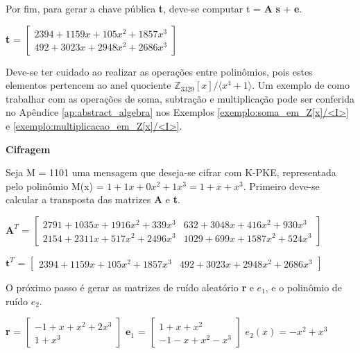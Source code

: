         Por fim, para gerar a chave pública \textbf{t}, deve-se computar t = \textbf{A} \textbf{s} + \textbf{e}.

        \begin{center}
             \textbf{t} = $\begin{bmatrix}
                2394 + 1159 x + 105 x^2 + 1857 x^3 \\
                492 + 3023 x + 2948 x^2 + 2686 x^3 
            \end{bmatrix}$   
        \end{center}

        Deve-se ter cuidado ao realizar as operações entre polinômios, pois estes elementos pertencem ao anel quociente $\mathbb{Z}_{3329}[x] / \langle x^4+1 \rangle$. Um exemplo de como trabalhar com as operações de soma, subtração e multiplicação pode ser conferida no Apêndice \ref{ap:abstract_algebra} nos Exemplos \ref{exemplo:soma_em_Z[x]/<I>} e \ref{exemplo:multiplicacao_em_Z[x]/<I>}.

    \noindent
    \textbf{Cifragem}

    Seja M  = 1101 uma mensagem que deseja-se cifrar com K-PKE, representada pelo polinômio M(x) = $1 + 1x + 0 x^2 + 1x^3 = 1+x+x^3$. Primeiro deve-se calcular a transposta das matrizes \textbf{A} e \textbf{t}.

    \begin{center}
       $\textbf{A}^T$ = $\begin{bmatrix}
           2791 + 1035 x + 1916 x^2 + 339 x^3  & 632 + 3048 x + 416 x^2 + 930 x^3 \\
           2154 + 2311 x + 517 x^2 + 2496 x^3  & 1029 + 699 x + 1587 x^2 + 524 x^3
        \end{bmatrix}$

       $\textbf{t}^T$ = $\begin{bmatrix}
           2394 + 1159 x + 105 x^2 + 1857 x^3 & 492 + 3023 x + 2948 x^2 + 2686 x^3 
        \end{bmatrix}$
    \end{center}

    O próximo passo é gerar as matrizes de ruído aleatório \textbf{r} e \textbf{$e_1$}, e o polinômio de ruído \textbf{$e_2$}.

    \begin{center}
        \textbf{r} = $\begin{bmatrix}
           -1 + x + x^2 + 2 x^3 \\
            1 + x^3
        \end{bmatrix}$
        $\textbf{e}_1$ = $\begin{bmatrix}
            1 + x + x^2 \\
            -1 -x + x^2 -x^3
        \end{bmatrix}$
        $e_2(x) = -x^2 + x^3$
    \end{center}


